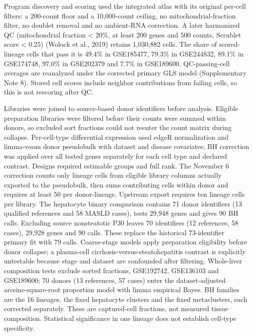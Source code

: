 Program discovery and scoring used the integrated atlas with its original per-cell filters: a 200-count floor and a 10,000-count ceiling, no mitochondrial-fraction filter, no doublet removal and no ambient-RNA correction. A later harmonized QC (mitochondrial fraction \textless{} 20\%, at least 200 genes and 500 counts, Scrublet score \textless{} 0.25) (Wolock et al., 2019) retains 1,030,882 cells. The share of scored-lineage cells that pass it is 49.4\% in GSE185477, 79.3\% in GSE244832, 89.1\% in GSE174748, 97.0\% in GSE202379 and 7.7\% in GSE189600. QC-passing-cell averages are reanalyzed under the corrected primary GLS model (Supplementary Note 8). Stored cell scores include neighbor contributions from failing cells, so this is not rescoring after QC.

Libraries were joined to source-based donor identifiers before analysis. Eligible preparation libraries were filtered before their counts were summed within donors, so excluded sort fractions could not reenter the count matrix during collapse. Per-cell-type differential expression used edgeR normalization and limma-voom donor pseudobulk with dataset and disease covariates; BH correction was applied over all tested genes separately for each cell type and declared contrast. Designs required estimable groups and full rank. The November 6 correction counts only lineage cells from eligible library columns actually exported to the pseudobulk, then sums contributing cells within donor and requires at least 50 per donor-lineage. Upstream export requires ten lineage cells per library. The hepatocyte binary comparison contains 71 donor identifiers (13 qualified references and 58 MASLD cases), tests 29,948 genes and gives 90 BH calls. Excluding source nonsteatotic P30 leaves 70 identifiers (12 references, 58 cases), 29,928 genes and 90 calls. These replace the historical 73-identifier primary fit with 79 calls. Coarse-stage models apply preparation eligibility before donor collapse; a plasma-cell cirrhosis-versus-steatohepatitis contrast is explicitly untestable because stage and dataset are confounded after filtering. Whole-liver composition tests exclude sorted fractions, GSE192742, GSE136103 and GSE189600; 70 donors (13 references, 57 cases) enter the dataset-adjusted arcsine-square-root proportion model with limma empirical Bayes. BH families are the 16 lineages, the fixed hepatocyte clusters and the fixed metaclusters, each corrected separately. These are captured-cell fractions, not measured tissue composition. Statistical significance in one lineage does not establish cell-type specificity.

